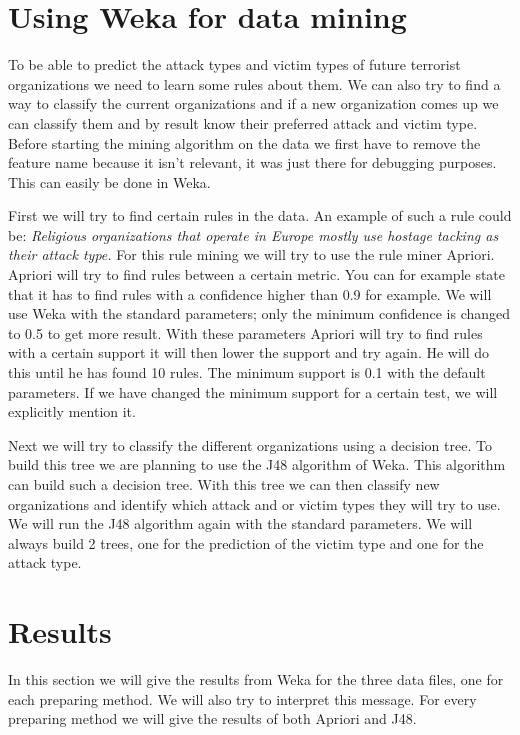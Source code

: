 \documentclass[a4]{article}
\begin{document}
\section{Using Weka for data mining}
\label{sec:weka}
To be able to predict the attack types and victim types of future terrorist organizations we need to learn some rules about them. We can also try to find a way to classify the current organizations and if a new organization comes up we can classify them and by result know their preferred attack and victim type. Before starting the mining algorithm on the data we first have to remove the feature name because it isn't relevant, it was just there for debugging purposes. This can easily be done in Weka.\par
First we will try to find certain rules in the data. An example of such a rule could be: \textit{Religious organizations that operate in Europe mostly use hostage tacking as their attack type.} For this rule mining we will try to use the rule miner Apriori. Apriori will try to find rules between a certain metric. You can for example state that it has to find rules with a confidence higher than 0.9 for example. We will use Weka with the standard parameters; only the minimum confidence is changed to 0.5 to get more result. With these parameters Apriori will try to find rules with a certain support it will then lower the support and try again. He will do this until he has found 10 rules. The minimum support is 0.1 with the default parameters. If we have changed the minimum support for a certain test, we will explicitly mention it.\par
Next we will try to classify the different organizations using a decision tree. To build this tree we are planning to use the J48 algorithm of Weka. This algorithm can build such a decision tree. With this tree we can then classify new organizations and identify which attack and or victim types they will try to use. We will run the J48 algorithm again with the standard parameters. We will always build 2 trees, one for the prediction of the victim type and one for the attack type.\par
\section{Results}
\label{sec:results}
In this section we will give the results from Weka for the three data files, one for each preparing method. We will also try to interpret this message. For every preparing method we will give the results of both Apriori and J48.
\end{document}
